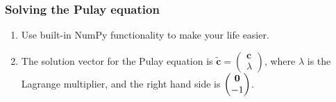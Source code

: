 \documentclass[11pt]{article}
\begin{document}
\subsubsection{Solving the Pulay equation}
\begin{enumerate}
	\item Use built-in NumPy functionality to make your life easier.
	\item The solution vector for the Pulay equation is $\tilde{\mathbf{c}} = \begin{pmatrix} {\mathbf{c}}\\ \lambda\end{pmatrix}$, where $\lambda$ is the Lagrange multiplier, and the right hand side is $\begin{pmatrix} {\bf 0}\\ -1\end{pmatrix}$.  
\end{enumerate}

\newpage
\end{document}

